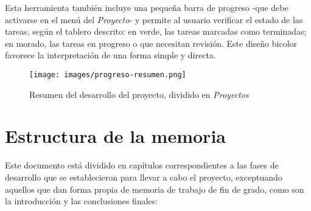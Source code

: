             \newpage


            Esta herramienta también incluye una pequeña barra de progreso -que debe activarse en el menú del \textit{Proyecto}- y permite al usuario verificar el estado de las tareas, según el tablero descrito: en verde, las tareas marcadas como terminadas; en morado, las tareas en progreso o que necesitan revisión. Este diseño bicolor favorece la interpretación de una forma simple y directa.

            \begin{figure*}[h]
            \label{figura:proyectos}


                \centering
                \texttt{[image: images/progreso-resumen.png]}
                \caption{Resumen del desarrollo del proyecto, dividido en \textit{Proyectos}}

            \end{figure*}

            \newpage



    \section{Estructura de la memoria}

        Este documento está dividido en capítulos correspondientes a las fases de desarrollo que se establecieron para llevar a cabo el proyecto, exceptuando aquellos que dan forma propia de memoria de trabajo de fin de grado, como son la introducción y las conclusiones finales:

